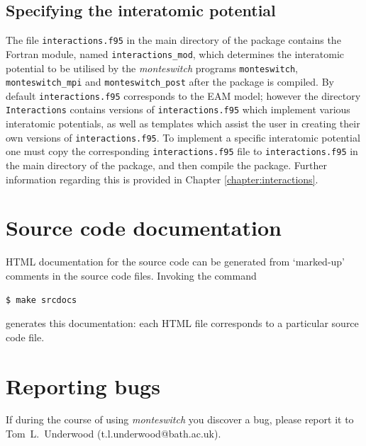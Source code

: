 \documentclass{report}
\begin{document}
\subsection{Specifying the interatomic potential}\label{sec:plugins}
The file \texttt{interactions.f95} in the main directory of the package contains the Fortran module, named \texttt{interactions\_mod}, which
determines the interatomic potential to be utilised by the \emph{monteswitch} programs \texttt{monteswitch}, \texttt{monteswitch\_mpi} and
\texttt{monteswitch\_post} after the package is compiled. 
%
By default \texttt{interactions.f95} corresponds to the EAM model; however the directory  \texttt{Interactions} contains versions of 
\texttt{interactions.f95} which implement various interatomic potentials, as well as templates which assist the user in creating their own
versions of \texttt{interactions.f95}. 
%
To implement a specific interatomic potential one must copy the corresponding \texttt{interactions.f95} file to \texttt{interactions.f95} 
in the main directory of the package, and then compile the package. Further information regarding this is provided in Chapter \ref{chapter:interactions}.


\section{Source code documentation}
HTML documentation for the source code can be generated from `marked-up' comments in the source code files. Invoking the command 
\begin{verbatim}
$ make srcdocs
\end{verbatim}
generates this documentation: each HTML file corresponds to a particular source code file.


\section{Reporting bugs}
If during the course of using \emph{monteswitch} you discover a bug, please report it to Tom~L.~Underwood (t.l.underwood@bath.ac.uk).


\end{document}
